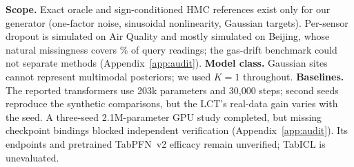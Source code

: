 \textbf{Scope.} Exact oracle and sign-conditioned HMC references exist only for our generator (one-factor noise, sinusoidal
nonlinearity, Gaussian targets). Per-sensor dropout is simulated on Air Quality and mostly simulated on Beijing,
whose natural missingness covers \Rbeijingnatmiss\% of query readings; the gas-drift benchmark could not separate
methods (Appendix~\ref{app:audit}). \textbf{Model class.} Gaussian sites cannot represent multimodal posteriors; we
used $K=1$ throughout. \textbf{Baselines.} The reported transformers use 203k parameters and 30{,}000 steps;
second seeds reproduce the synthetic comparisons, but the LCT's real-data gain varies with the seed. A three-seed
2.1M-parameter GPU study completed, but missing checkpoint bindings blocked independent verification
(Appendix~\ref{app:audit}). Its endpoints and pretrained TabPFN~v2 efficacy remain unverified; TabICL is unevaluated.
